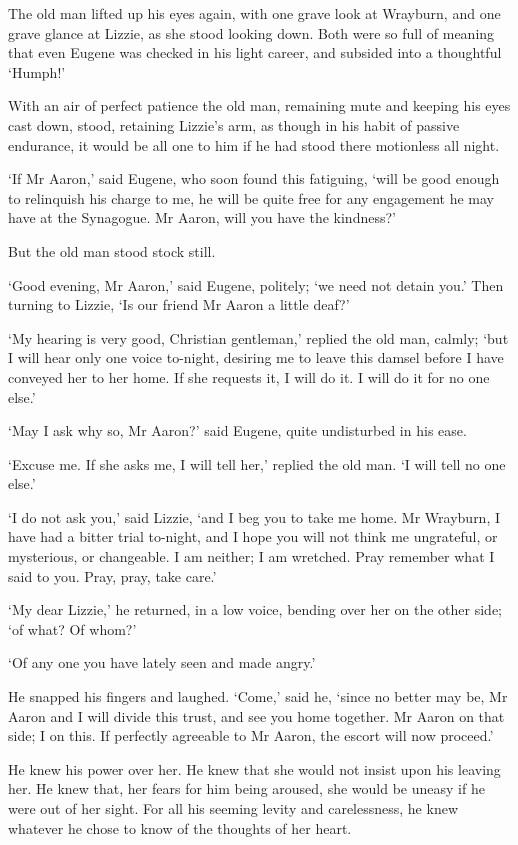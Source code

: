 The old man lifted up his eyes again, with one grave look at Wrayburn,
and one grave glance at Lizzie, as she stood looking down. Both were so
full of meaning that even Eugene was checked in his light career, and
subsided into a thoughtful ‘Humph!’

With an air of perfect patience the old man, remaining mute and keeping
his eyes cast down, stood, retaining Lizzie’s arm, as though in his
habit of passive endurance, it would be all one to him if he had stood
there motionless all night.

‘If Mr Aaron,’ said Eugene, who soon found this fatiguing, ‘will be good
enough to relinquish his charge to me, he will be quite free for any
engagement he may have at the Synagogue. Mr Aaron, will you have the
kindness?’

But the old man stood stock still.

‘Good evening, Mr Aaron,’ said Eugene, politely; ‘we need not detain
you.’ Then turning to Lizzie, ‘Is our friend Mr Aaron a little deaf?’

‘My hearing is very good, Christian gentleman,’ replied the old man,
calmly; ‘but I will hear only one voice to-night, desiring me to leave
this damsel before I have conveyed her to her home. If she requests it,
I will do it. I will do it for no one else.’

‘May I ask why so, Mr Aaron?’ said Eugene, quite undisturbed in his
ease.

‘Excuse me. If she asks me, I will tell her,’ replied the old man. ‘I
will tell no one else.’

‘I do not ask you,’ said Lizzie, ‘and I beg you to take me home. Mr
Wrayburn, I have had a bitter trial to-night, and I hope you will not
think me ungrateful, or mysterious, or changeable. I am neither; I am
wretched. Pray remember what I said to you. Pray, pray, take care.’

‘My dear Lizzie,’ he returned, in a low voice, bending over her on the
other side; ‘of what? Of whom?’

‘Of any one you have lately seen and made angry.’

He snapped his fingers and laughed. ‘Come,’ said he, ‘since no better
may be, Mr Aaron and I will divide this trust, and see you home
together. Mr Aaron on that side; I on this. If perfectly agreeable to Mr
Aaron, the escort will now proceed.’

He knew his power over her. He knew that she would not insist upon his
leaving her. He knew that, her fears for him being aroused, she would
be uneasy if he were out of her sight. For all his seeming levity and
carelessness, he knew whatever he chose to know of the thoughts of her
heart.

